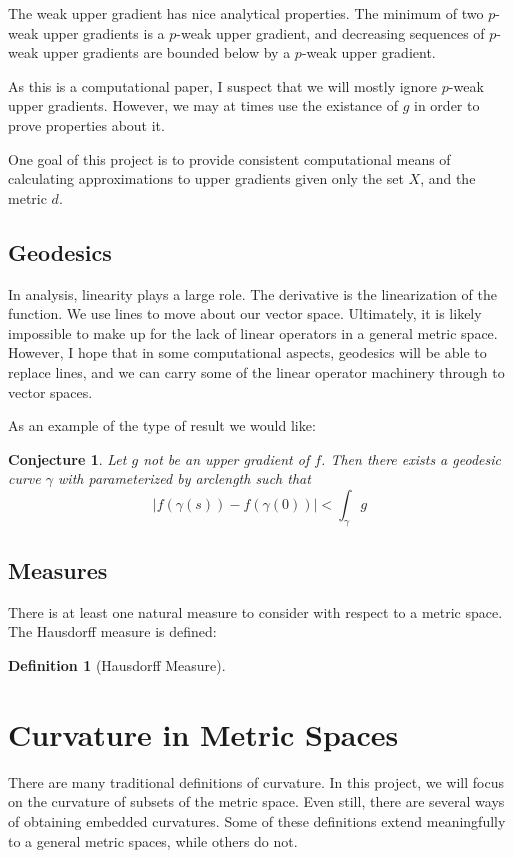 \documentclass{article}
\theoremstyle{definition}
\theoremstyle{definition}
\newtheorem*{defn}{Definition}
\theoremstyle{plain}
\newtheorem{conj}[thm]{Conjecture}
\renewcommand{\(}{\left(}
\renewcommand{\)}{\right)}
\begin{document}
The weak upper gradient has nice analytical properties.  The minimum of two $p$-weak upper gradients is a $p$-weak upper gradient, and decreasing sequences of $p$-weak upper gradients are bounded below by a $p$-weak upper gradient.

As this is a computational paper, I suspect that we will mostly ignore $p$-weak upper gradients.  However, we may at times use the existance of $g$ in order to prove properties about it.

One goal of this project is to provide consistent computational means of calculating approximations to upper gradients given only the set $X$, and the metric $d$.
\subsection*{Geodesics}
In analysis, linearity plays a large role.  The derivative is the linearization of the function.  We use lines to move about our vector space.  Ultimately, it is likely impossible to make up for the lack of linear operators in a general metric space.  However, I hope that in some computational aspects, geodesics will be able to replace lines, and we can carry some of the linear operator machinery through to vector spaces.

As an example of the type of result we would like:
\begin{conj}
Let $g$ not be an upper gradient of $f$.  Then there exists a geodesic curve $\gamma$ with parameterized by arclength such that
$$ \left\vert f(\gamma(s)) - f(\gamma(0)) \right\vert < \int_\gamma g $$
\end{conj}

\subsection*{Measures}

There is at least one natural measure to consider with respect to a metric space.  The Hausdorff measure is defined:
\begin{defn}[Hausdorff Measure] \label{def:hausdorff-measure}
\end{defn}

\section{Curvature in Metric Spaces}
There are many traditional definitions of curvature.  In this project, we will focus on the curvature of subsets of the metric space.  Even still, there are several ways of obtaining embedded curvatures.  Some of these definitions extend meaningfully to a general metric spaces, while others do not.
\end{document}
